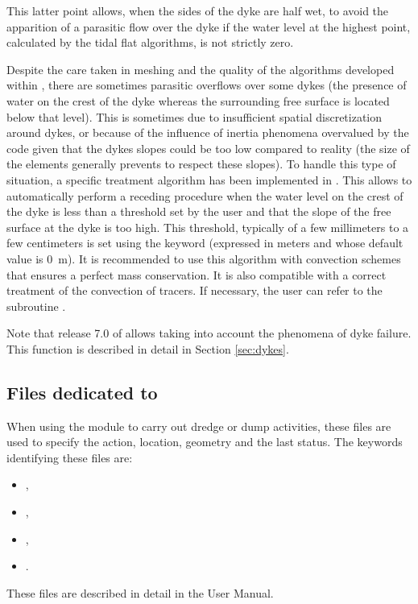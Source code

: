 This latter point allows, when the sides of the dyke are half wet,
to avoid the apparition of a parasitic flow over the dyke if the water level at
the highest point, calculated by the tidal flat algorithms, is not strictly zero.

Despite the care taken in meshing and the quality of the algorithms developed
within , there are sometimes parasitic overflows over some dykes
(the presence of water on the crest of the dyke whereas the surrounding free
surface is located below that level).
This is sometimes due to insufficient spatial discretization around dykes,
or because of the influence of inertia phenomena overvalued by the code
given that the dykes slopes could be too low compared to reality
(the size of the elements generally prevents to respect these slopes).
To handle this type of situation, a specific treatment algorithm has been
implemented in .
This allows to automatically perform a receding procedure when the water level
on the crest of the dyke is less than a threshold set by the user
and that the slope of the free surface at the dyke is too high.
This threshold, typically of a few millimeters to a few centimeters
is set using the keyword 
(expressed in meters and whose default value is 0~m).
It is recommended to use this algorithm with convection schemes
that ensures a perfect mass conservation.
It is also compatible with a correct treatment of the convection of tracers.
If necessary, the user can refer to the subroutine .

Note that release 7.0 of  allows taking into account the phenomena
of dyke failure.
This function is described in detail in Section \ref{sec:dykes}.

\subsection{Files dedicated to \nestor}

When using the module \nestor to carry out dredge or dump activities, these
files are used to specify the action, location, geometry and the last status.
The keywords identifying these files are:

\begin{itemize}
\item {},

\item {},

\item {},

\item {}.
\end{itemize}

These files are described in detail in the \nestor User Manual. 

